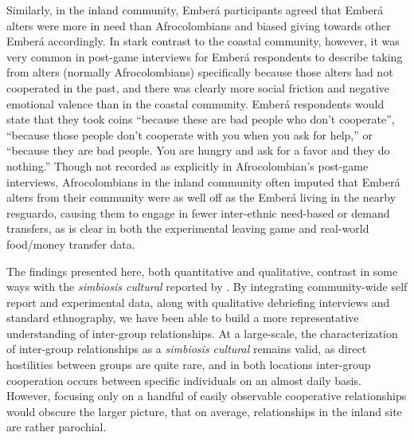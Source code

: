 \documentclass[bibauthoryear]{aa}
\begin{document}
Similarly, in the inland community, Ember\'a participants agreed that Ember\'a alters were more in need than Afrocolombians and biased giving towards other Ember\'a accordingly. In stark contrast to the coastal community, however, it was very common in post-game interviews for Ember\'a respondents to describe taking from alters (normally Afrocolombians) specifically because those alters had not cooperated in the past, and there was clearly more social friction and negative emotional valence than in the coastal community. Ember\'a respondents would state that they took coins ``because these  are bad people  who don't cooperate'', ``because those people don't cooperate with you when you ask for help,'' or ``because they are bad people. You are hungry and ask for a favor and they do nothing.'' Though not recorded as explicitly in Afrocolombian's post-game interviews,  Afrocolombians in the inland community often imputed that Ember\'a alters from their community were as well off as the Ember\'a living in the nearby resguardo, causing them to engage in fewer inter-ethnic need-based or demand transfers, as is clear in both the experimental leaving game and real-world food/money transfer data.


The findings presented here, both quantitative and qualitative, contrast in some ways with the \textit{simbiosis cultural} reported by \citet{Cay73}. By integrating community-wide self report and experimental data, along with qualitative debriefing interviews and standard ethnography, we have been able to build a more representative understanding of inter-group relationships. At a large-scale, the characterization of inter-group relationships as a \textit{simbiosis cultural} remains valid, as direct hostilities between groups are quite rare, and in both locations inter-group cooperation occurs between specific individuals on an almost daily basis. However, focusing only on a handful of easily observable cooperative relationships would obscure the larger picture, that on average, relationships in the inland site are rather parochial.
  
\end{document}
